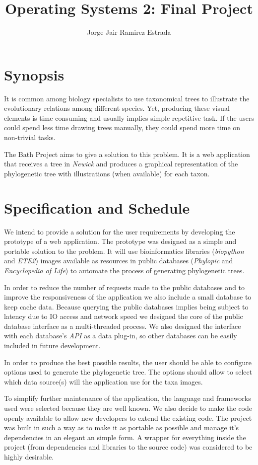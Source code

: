 \documentclass[10pt]{article}
\author{Jorge Jair Ramirez Estrada}
\title{Operating Systems 2: Final Project}
\begin{document}
\maketitle

\section{Synopsis}
It is common among biology specialists to use taxonomical trees to illustrate the evolutionary relations among different species. Yet, producing these visual elements is time consuming and usually implies simple repetitive task. If the users could spend less time drawing trees manually, they could spend more time on non-trivial tasks.

The Bath Project aims to give a solution to this problem. It is a web application that receives a tree in \textit{Newick} and produces a graphical representation of the phylogenetic tree with illustrations (when available) for each taxon.

\section{Specification and Schedule}
We intend to provide a solution for the user requirements by developing the prototype of a web application. The prototype was designed as a simple and portable solution to the problem. It will use bioinformatics libraries (\textit{biopython} and \textit{ETE2}) images available as resources in public databases (\textit{Phylopic} and \textit{Encyclopedia of Life}) to automate the process of generating phylogenetic trees.

In order to reduce the number of requests made to the public databases and to improve the responsiveness of the application we also include a small database to keep cache data. Because querying the public databases implies being subject to latency due to IO access and network speed we designed the core of the public database interface as a multi-threaded process. We also designed the interface with each database's \textit{API} as a data plug-in, so other databases can be easily included in future development.

In order to produce the best possible results, the user should be able to configure options used to generate the phylogenetic tree. The options should allow to select which data source(s) will the application use for the taxa images.

To simplify further maintenance of the application, the language and frameworks used were selected because they are well known. We also decide to make the code openly available to allow new developers to extend the existing code. The project was built in such a way as to make it as portable as possible and manage it's dependencies in an elegant an simple form. A wrapper for everything inside the project (from dependencies and libraries to the source code) was considered to be highly desirable.
\end{document}
